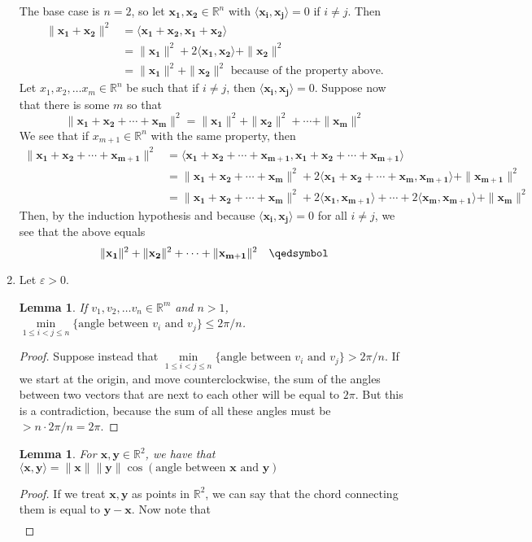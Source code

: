 \documentclass[12pt]{article}
\newcommand{\ip}[2]{\langle \mathbf{#1}, \mathbf{#2} \rangle}
\newcommand{\mg}[1]{\| \mathbf{#1} \|}
\newcommand{\R}{\mathbb{R}}
\newtheorem{lemma}[theorem]{Lemma}
\begin{document}
\begin{enumerate}[leftmargin=\labelsep]
		The base case is $n=2$, so let $\mathbf{x_1}, \mathbf{x_2} \in \R^n$ with $\ip{x_i}{x_j} = 0$ if $i \neq j$. Then 
		\begin{align*}
			\mg{x_1+x_2}^2&=\ip{x_1+x_2}{x_1+x_2} \\&= \mg{x_1}^2+2\ip{x_1}{x_2}+\mg{x_2}^2 \\
			&= \mg{x_1}^2+\mg{x_2}^2 \text{ because of the property above.}
		\end{align*}
		Let $x_1, x_2, \ldots x_m \in \R^n$ be such that if $i \neq j$, then $\ip{x_i}{x_j}=0$. Suppose now that there is some $m$ so that $$\mg{x_1+x_2+\cdots+x_m}^2=\mg{x_1}^2+\mg{x_2}^2+\cdots+\mg{x_m}^2$$
		We see that if $x_{m+1} \in \R^n$ with the same property, then
		\begin{align*}
			\mg{x_1+x_2+\cdots+x_{m+1}}^2 &= \ip{x_1+x_2+\cdots+x_{m+1}}{x_1+x_2+\cdots+x_{m+1}} 
				\\&= \mg{x_1+x_2+\cdots+x_m}^2+2\ip{x_1+x_2+\cdots+x_m}{x_{m+1}}+\mg{x_{m+1}}^2
				\\&= \mg{x_1+x_2+\cdots+x_m}^2+2\ip{x_1}{x_{m+1}}+\cdots+2\ip{x_m}{x_{m+1}}+\mg{x_{m}}^2
		\end{align*}
		Then, by the induction hypothesis and because $\ip{x_i}{x_j}=0$ for all $i\neq j$, we see that the above equals $$\mg{x_1}^2+\mg{x_2}^2+\cdots+\mg{x_{m+1}}^2 \quad\qedsymbol$$
	\item 
	Let $\varepsilon > 0$.
	\begin{lemma}
		If $v_1, v_2, \ldots v_n \in \R^m$ and $n>1$, $\min\limits_{1\leq i < j \leq n}{\text{\{angle between $v_i$ and $v_j$\}}} \leq 2\pi/n$.
	\end{lemma}
	\begin{proof}
	Suppose instead that $\min\limits_{1\leq i < j \leq n}{\text{\{angle between $v_i$ and $v_j$\}}} > 2\pi/n$. If we start at the origin, and move counterclockwise, the sum of the angles between two vectors that are next to each other will be equal to $2\pi$. But this is a contradiction, because the sum of all these angles must be $>n\cdot 2\pi/n = 2\pi$. 
	\end{proof}
	\begin{lemma}
		For $\mathbf{x}, \mathbf{y} \in \R^2$, we have that $\ip{x}{y} =\mg{x}\mg{y} \cos(\text{angle between $\mathbf{x}$ and $\mathbf{y}$})$
	\end{lemma}
	\begin{proof}
		If we treat $\mathbf{x,y}$ as points in $\R^2$, we can say that the chord connecting them is equal to $\mathbf{y-x}$. Now note that 
		\begin{align*}

\end{align*}
\end{proof}
\end{enumerate}
\end{document}
